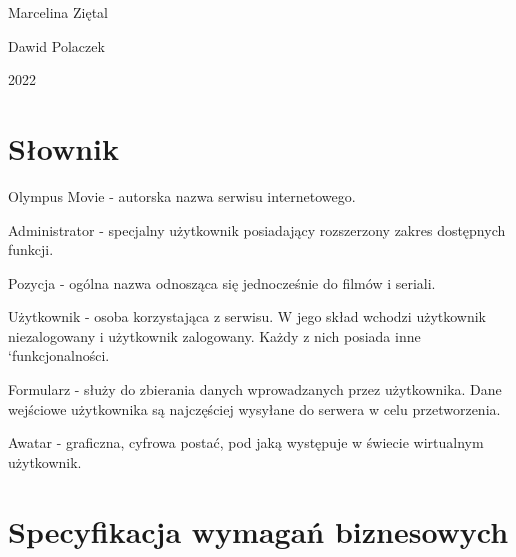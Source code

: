 \documentclass[12pt]{article}
\begin{document}
\begin{titlepage}
\begin{minipage}{0.4\textwidth}
\begin{flushright}
			Marcelina Ziętal
			
			Dawid Polaczek
		\end{flushright}
	\end{minipage}
	
	
	\vspace{\fill}
	2022
	
	
	
\end{titlepage}
\begin{flushleft}

	
	\tableofcontents
	\pagebreak
	

	\section{Słownik}	%
		Olympus Movie - autorska nazwa serwisu internetowego.
		
		Administrator - specjalny użytkownik posiadający rozszerzony zakres dostępnych funkcji.
		
		Pozycja - ogólna nazwa odnosząca się jednocześnie do filmów i seriali.
		
		Użytkownik - osoba korzystająca z serwisu. W jego skład wchodzi użytkownik niezalogowany i użytkownik zalogowany. Każdy z nich posiada inne `funkcjonalności.
		
		Formularz -  służy do zbierania danych wprowadzanych przez użytkownika. Dane wejściowe użytkownika są najczęściej wysyłane do serwera w celu przetworzenia.
		
		Awatar - graficzna, cyfrowa postać, pod jaką występuje w świecie wirtualnym użytkownik.
		
\pagebreak
	\section{Specyfikacja wymagań biznesowych}
	

\end{flushleft}
\end{document}
